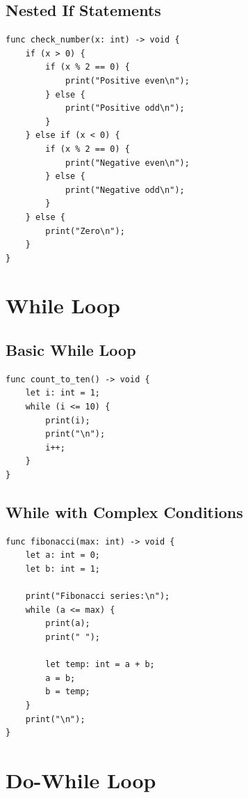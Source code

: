 \documentclass[12pt,a4paper,oneside]{book}
\begin{document}
\subsection{Nested If Statements}

\begin{lstlisting}[style=algo, caption={Nested Conditions}]
func check_number(x: int) -> void {
    if (x > 0) {
        if (x % 2 == 0) {
            print("Positive even\n");
        } else {
            print("Positive odd\n");
        }
    } else if (x < 0) {
        if (x % 2 == 0) {
            print("Negative even\n");
        } else {
            print("Negative odd\n");
        }
    } else {
        print("Zero\n");
    }
}
\end{lstlisting}

\section{While Loop}

\subsection{Basic While Loop}

\begin{lstlisting}[style=algo, caption={Counting with While}]
func count_to_ten() -> void {
    let i: int = 1;
    while (i <= 10) {
        print(i);
        print("\n");
        i++;
    }
}
\end{lstlisting}

\subsection{While with Complex Conditions}

\begin{lstlisting}[style=algo, caption={Fibonacci Numbers}]
func fibonacci(max: int) -> void {
    let a: int = 0;
    let b: int = 1;
    
    print("Fibonacci series:\n");
    while (a <= max) {
        print(a);
        print(" ");
        
        let temp: int = a + b;
        a = b;
        b = temp;
    }
    print("\n");
}
\end{lstlisting}

\section{Do-While Loop}
\end{document}
